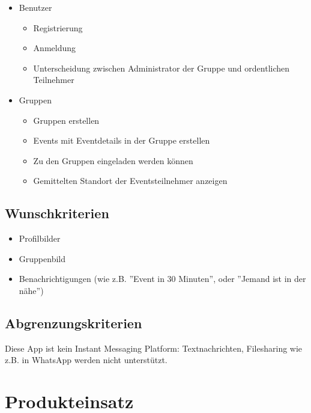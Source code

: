 \documentclass[parskip=full]{scrartcl}
\begin{document}
\begin{itemize}
	\item Benutzer  
	\begin{itemize}
	 	\item Registrierung
	 	\item Anmeldung
	 	\item Unterscheidung zwischen Administrator der Gruppe und ordentlichen Teilnehmer
	\end{itemize} 
	\item Gruppen
		\begin{itemize}
	 		\item Gruppen erstellen
	 		\item Events mit Eventdetails in der Gruppe erstellen 
	 		\item Zu den Gruppen eingeladen werden können
	 		\item Gemittelten Standort der Eventsteilnehmer anzeigen 
		\end{itemize}
\end{itemize}
	
\subsection{Wunschkriterien}
\begin{itemize}
	\item Profilbilder
	\item Gruppenbild
	\item Benachrichtigungen (wie z.B. ''Event in 30 Minuten'', oder ''Jemand ist in der nähe'')
\end{itemize}

\subsection{Abgrenzungskriterien}
Diese App ist kein Instant Messaging Platform: Textnachrichten, Filesharing wie z.B. in WhatsApp werden nicht unterstützt.


\section{Produkteinsatz}
\end{document}
